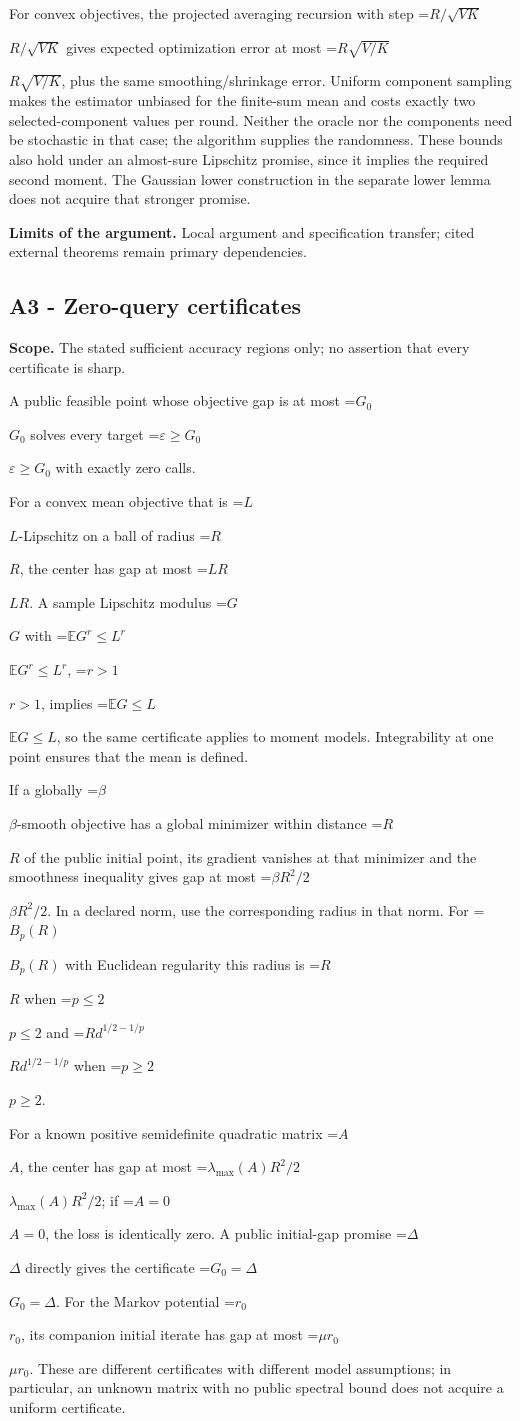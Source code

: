 \documentclass[10pt,a4paper]{article}
\newcommand{\AtlasMath}[1]{\par\begingroup\centering\setbox0=\hbox{$\displaystyle #1$}\ifdim\wd0>1.4\linewidth\typeout{ATLAS WIDE FORMULA: \the\wd0}\fi\ifdim\wd0>\linewidth\resizebox{\linewidth}{!}{\box0}\else\box0\fi\par\endgroup}
\newcommand{\AtlasInlineMath}[1]{\begingroup\setbox0=\hbox{$#1$}\ifdim\wd0>.4\linewidth\endgroup\AtlasMath{#1}\else\endgroup$#1$\fi}
\begin{document}
For convex objectives, the projected averaging recursion with step \AtlasInlineMath{R/\sqrt{VK}} gives expected optimization error at most \AtlasInlineMath{R\sqrt{V/K}}, plus the same smoothing/shrinkage error. Uniform component sampling makes the estimator unbiased for the finite-sum mean and costs exactly two selected-component values per round. Neither the oracle nor the components need be stochastic in that case; the algorithm supplies the randomness. These bounds also hold under an almost-sure Lipschitz promise, since it implies the required second moment. The Gaussian lower construction in the separate lower lemma does not acquire that stronger promise.

\textbf{Limits of the argument.} Local argument and specification transfer; cited external theorems remain primary dependencies.

\subsection{A3 - Zero-query certificates}
\textbf{Scope.} The stated sufficient accuracy regions only; no assertion that every certificate is sharp.

A public feasible point whose objective gap is at most \AtlasInlineMath{G_0} solves every target \AtlasInlineMath{\varepsilon\ge G_0} with exactly zero calls.

For a convex mean objective that is \AtlasInlineMath{L}-Lipschitz on a ball of radius \AtlasInlineMath{R}, the center has gap at most \AtlasInlineMath{LR}. A sample Lipschitz modulus \AtlasInlineMath{G} with \AtlasInlineMath{\mathbb E G^r\le L^r}, \AtlasInlineMath{r>1}, implies \AtlasInlineMath{\mathbb E G\le L}, so the same certificate applies to moment models. Integrability at one point ensures that the mean is defined.

If a globally \AtlasInlineMath{\beta}-smooth objective has a global minimizer within distance \AtlasInlineMath{R} of the public initial point, its gradient vanishes at that minimizer and the smoothness inequality gives gap at most \AtlasInlineMath{\beta R^2/2}. In a declared norm, use the corresponding radius in that norm. For \AtlasInlineMath{B_p(R)} with Euclidean regularity this radius is \AtlasInlineMath{R} when \AtlasInlineMath{p\le2} and \AtlasInlineMath{R d^{1/2-1/p}} when \AtlasInlineMath{p\ge2}.

For a known positive semidefinite quadratic matrix \AtlasInlineMath{A}, the center has gap at most \AtlasInlineMath{\lambda_{\max}(A)R^2/2}; if \AtlasInlineMath{A=0}, the loss is identically zero. A public initial-gap promise \AtlasInlineMath{\Delta} directly gives the certificate \AtlasInlineMath{G_0=\Delta}. For the Markov potential \AtlasInlineMath{r_0}, its companion initial iterate has gap at most \AtlasInlineMath{\mu r_0}. These are different certificates with different model assumptions; in particular, an unknown matrix with no public spectral bound does not acquire a uniform certificate.
\end{document}
